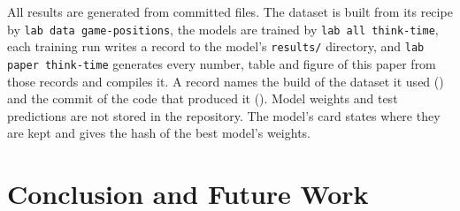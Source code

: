 \documentclass[11pt]{article}
\begin{document}
All results are generated from committed files. The dataset is built from
its recipe by \texttt{lab data game-positions}, the models are trained by
\texttt{lab all think-time}, each training run writes a record to the model's
\texttt{results/} directory, and \texttt{lab paper think-time} generates
every number, table and figure of this paper from those records and compiles
it. A record names the build of the dataset it used ()
and the commit of the code that produced it (). Model weights
and test predictions are not stored in the repository. The model's card
states where they are kept and gives the hash of the best model's weights.

\section{Conclusion and Future Work}
\label{sec:conclusion}
\end{document}
